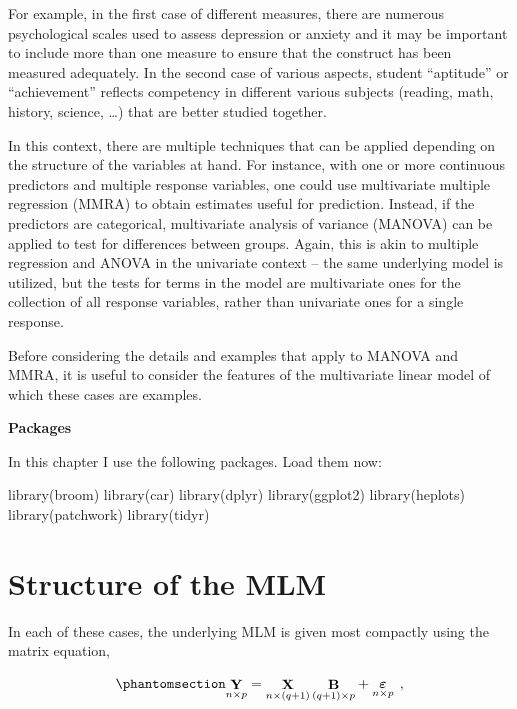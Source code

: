 \documentclass[
  letterpaper,
  10pt,
  krantz2]{krantz}
\makeatletter
\newenvironment{Shaded}{\begin{snugshade}}{\end{snugshade}}
\newcommand{\FunctionTok}[1]{\textcolor[rgb]{0.28,0.35,0.67}{#1}}
\newcommand{\NormalTok}[1]{\textcolor[rgb]{0.00,0.23,0.31}{#1}}
\newenvironment{kframe}{%
  \medskip{}
  \setlength{\fboxsep}{.8em}
  \def\at@end@of@kframe{}%
  \ifinner\ifhmode%
  \def\at@end@of@kframe{\end{minipage}}%
  \begin{minipage}{\columnwidth}%
  \fi\fi%
  \def\FrameCommand##1{\hskip\@totalleftmargin \hskip-\fboxsep
  \colorbox{shadecolor}{##1}\hskip-\fboxsep
      \hskip-\linewidth \hskip-\@totalleftmargin \hskip\columnwidth}%
  \MakeFramed {\advance\hsize-\width
    \@totalleftmargin\z@ \linewidth\hsize
    \@setminipage}}%
{\par\unskip\endMakeFramed%
  \at@end@of@kframe}
\renewenvironment{Shaded}{\begin{kframe}}{\end{kframe}}
\makeatother
\begin{document}
For example, in the first case of different measures, there are numerous
psychological scales used to assess depression or anxiety and it may be
important to include more than one measure to ensure that the construct
has been measured adequately. In the second case of various aspects,
student ``aptitude'' or ``achievement'' reflects competency in different
various subjects (reading, math, history, science, \ldots) that are
better studied together.

In this context, there are multiple techniques that can be applied
depending on the structure of the variables at hand. For instance, with
one or more continuous predictors and multiple response variables, one
could use multivariate multiple regression (MMRA) to obtain estimates
useful for prediction. Instead, if the predictors are categorical,
multivariate analysis of variance (MANOVA) can be applied to test for
differences between groups. Again, this is akin to multiple regression
and ANOVA in the univariate context -- the same underlying model is
utilized, but the tests for terms in the model are multivariate ones for
the collection of all response variables, rather than univariate ones
for a single response.

Before considering the details and examples that apply to MANOVA and
MMRA, it is useful to consider the features of the multivariate linear
model of which these cases are examples.

\textbf{Packages}

In this chapter I use the following packages. Load them now:

\begin{Shaded}
\begin{Highlighting}[]
\FunctionTok{library}\NormalTok{(broom)}
\FunctionTok{library}\NormalTok{(car)}
\FunctionTok{library}\NormalTok{(dplyr)}
\FunctionTok{library}\NormalTok{(ggplot2)}
\FunctionTok{library}\NormalTok{(heplots)}
\FunctionTok{library}\NormalTok{(patchwork)}
\FunctionTok{library}\NormalTok{(tidyr)}
\end{Highlighting}
\end{Shaded}

\section{Structure of the MLM}\label{structure-of-the-mlm}

In each of these cases, the underlying MLM is given most compactly using
the matrix equation,

\begin{equation}\phantomsection\label{eq-mlm}{
\mathord{\mathop{\mathbf{Y}}\limits_{n \times p}} = 
\mathord{\mathop{\mathbf{X}}\limits_{n \times (q+1)}} \, \mathord{\mathop{\mathbf{B}}\limits_{(q+1) \times p}} + \mathord{\mathop{\mathbf{\boldsymbol{\Large\varepsilon}}}\limits_{n \times p}} \:\: ,
}\end{equation}
\end{document}
